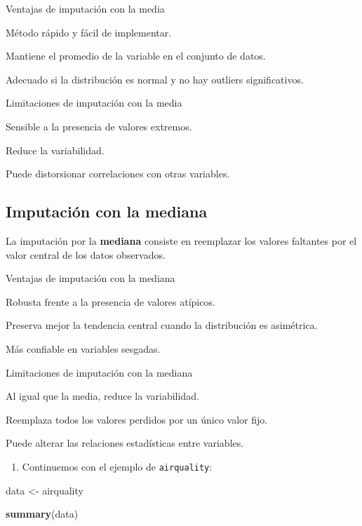 \documentclass[
]{book}
\newenvironment{Shaded}{\begin{snugshade}}{\end{snugshade}}
\newcommand{\FunctionTok}[1]{\textcolor[rgb]{0.13,0.29,0.53}{\textbf{#1}}}
\newcommand{\NormalTok}[1]{#1}
\newcommand{\OtherTok}[1]{\textcolor[rgb]{0.56,0.35,0.01}{#1}}
\providecommand{\tightlist}{%
  \setlength{\itemsep}{0pt}\setlength{\parskip}{0pt}}
\begin{document}
{} Ventajas de imputación con la media

Método rápido y fácil de implementar.

Mantiene el promedio de la variable en el conjunto de datos.

Adecuado si la distribución es normal y no hay outliers significativos.

{} Limitaciones de imputación con la media

Sensible a la presencia de valores extremos.

Reduce la variabilidad.

Puede distorsionar correlaciones con otras variables.

\subsection{Imputación con la mediana}\label{imputaciuxf3n-con-la-mediana}

La imputación por la \textbf{mediana} consiste en reemplazar los valores faltantes por el valor central de los datos observados.

{} Ventajas de imputación con la mediana

Robusta frente a la presencia de valores atípicos.

Preserva mejor la tendencia central cuando la distribución es asimétrica.

Más confiable en variables sesgadas.

{} Limitaciones de imputación con la mediana

Al igual que la media, reduce la variabilidad.

Reemplaza todos los valores perdidos por un único valor fijo.

Puede alterar las relaciones estadísticas entre variables.

\begin{enumerate}
\def\labelenumi{\arabic{enumi}.}
\tightlist
\item
  Continuemos con el ejemplo de \texttt{airquality}:
\end{enumerate}

\begin{Shaded}
\begin{Highlighting}[]
\NormalTok{data }\OtherTok{\textless{}{-}}\NormalTok{ airquality}

\FunctionTok{summary}\NormalTok{(data) }
\end{Highlighting}
\end{Shaded}
\end{document}
